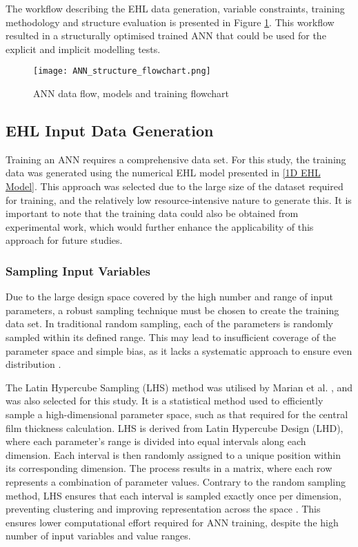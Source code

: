 The workflow describing the EHL data generation, variable constraints, training methodology and structure evaluation is presented in Figure \ref{ANN flowchart}. This workflow resulted in a structurally optimised trained ANN that could be used for the explicit and implicit modelling tests.

\begin{figure}  
	\centering
	\texttt{[image: ANN\_structure\_flowchart.png]}
	\caption{ANN data flow, models and training flowchart}
	\label{ANN flowchart}
\end{figure} 

\subsection{EHL Input Data Generation}

Training an ANN requires a comprehensive data set. For this study, the training data was generated using the numerical EHL model presented in \ref{1D EHL Model}. This approach was selected due to the large size of the dataset required for training, and the relatively low resource-intensive nature to generate this. It is important to note that the training data could also be obtained from experimental work, which would further enhance the applicability of this approach for future studies.

\subsubsection{Sampling Input Variables}

Due to the large design space covered by the high number and range of input parameters, a robust sampling technique must be chosen to create the training data set. In traditional random sampling, each of the parameters is randomly sampled within its defined range. This may lead to insufficient coverage of the parameter space and simple bias, as it lacks a systematic approach to ensure even distribution \cite{Preece2016}.

The Latin Hypercube Sampling (LHS) method was utilised by Marian et al. \cite{Marian2022}, and was also selected for this study. It is a statistical method used to efficiently sample a high-dimensional parameter space, such as that required for the central film thickness calculation. LHS is derived from Latin Hypercube Design (LHD), where each parameter’s range is divided into equal intervals along each dimension. Each interval is then randomly assigned to a unique position within its corresponding dimension. The process results in a matrix, where each row represents a combination of parameter values. Contrary to the random sampling method, LHS ensures that each interval is sampled exactly once per dimension, preventing clustering and improving representation across the space \cite{Preece2016}. This ensures lower computational effort required for ANN training, despite the high number of input variables and value ranges.

